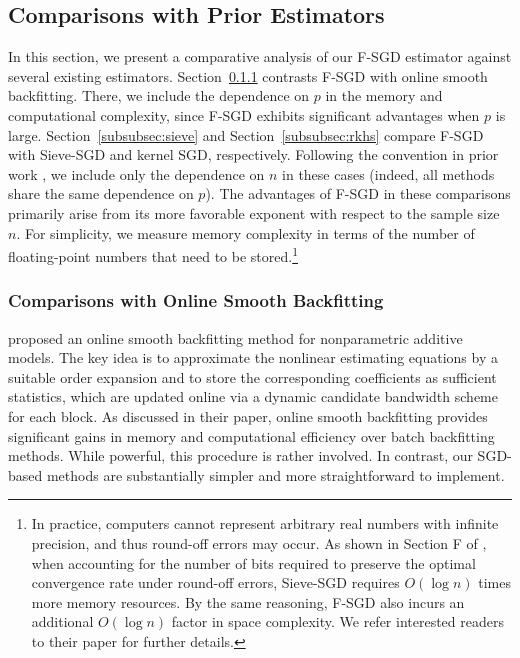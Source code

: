\subsection{Comparisons with Prior Estimators}\label{subsec:univariate}
In this section, we present a comparative analysis of our F-SGD estimator against 
several existing estimators. Section~\ref{subsubsec:backfitting} contrasts F-SGD 
with online smooth backfitting. There, we include the dependence on $p$ 
in the memory and computational complexity, since F-SGD exhibits significant 
advantages when $p$ is large. Section~\ref{subsubsec:sieve} and 
Section~\ref{subsubsec:rkhs} compare F-SGD with Sieve-SGD and kernel SGD, 
respectively. Following the convention in prior work 
\cite{zhang2022sieve, 4406a3ce-1e59-3ed8-8c25-9f7d75b81f14}, we include only the 
dependence on $n$ in these cases (indeed, all methods share the same dependence on $p$). 
The advantages of F-SGD in these comparisons primarily arise from its more favorable 
exponent with respect to the sample size $n$. For simplicity, we measure memory complexity in terms of the number of 
floating-point numbers that need to be stored.\footnote{In practice, computers 
cannot represent arbitrary real numbers with infinite precision, and thus 
round-off errors may occur. As shown in Section F of \cite{zhang2022sieve}, 
when accounting for the number of bits required to preserve the optimal 
convergence rate under round-off errors, Sieve-SGD requires $O(\log n)$ times 
more memory resources. By the same reasoning, F-SGD also incurs an additional 
$O(\log n)$ factor in space complexity. We refer interested readers to their paper for further details.}
 
 

 
\subsubsection{Comparisons with Online Smooth Backfitting}\label{subsubsec:backfitting}

\cite{yang2023online} proposed an online smooth backfitting method for nonparametric additive models. The key idea is to approximate the nonlinear estimating equations by a suitable order expansion and to store the corresponding coefficients as sufficient statistics, which are updated online via a dynamic candidate bandwidth scheme for each block. As discussed in their paper, online smooth backfitting provides significant gains in memory and computational efficiency over batch backfitting 
methods. While powerful, this procedure is rather involved. In contrast, our SGD-based methods are substantially simpler and more straightforward to implement.  

